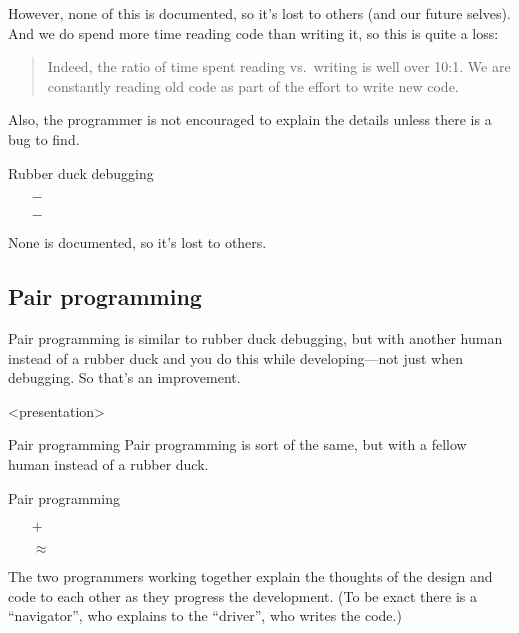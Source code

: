 However, none of this is documented, so it's lost to others (and our future 
selves).
And we do spend more time reading code than writing it, so this is quite a 
loss: \blockcquote[p.~14]{CleanCode}{%
  Indeed, the ratio of time spent reading vs.~writing is well over 10:1.
  We are constantly reading old code as part of the effort to write new code.%
}
Also, the programmer is not encouraged to explain the details unless there is a 
bug to find.

\begin{frame}
\begin{block}{Rubber duck debugging}
  \begin{itemize}
    \item[\(-\)] {\color{red}\LPexplain}
    \item[\(-\)] {\color{red}\LPorder}
  \end{itemize}
\end{block}
\begin{remark}
  None is documented, so it's lost to others.
\end{remark}
\end{frame}

\subsection{Pair programming}

Pair programming is similar to rubber duck debugging, but with another human 
instead of a rubber duck and you do this while developing---not just when 
debugging.
So that's an improvement.

\begin{frame}<presentation>
\begin{block}{Pair programming}
  Pair programming is sort of the same, but with a fellow human instead of a 
  rubber duck.
\end{block}

\begin{block}{Pair programming}
  \begin{itemize}
    \item[\(+\)] {\color{green!75!black}\LPexplain}
    \item[\(\approx\)] {\color{orange}\LPorder}
  \end{itemize}
\end{block}
\end{frame}

The two programmers working together explain the thoughts of the design and 
code to each other as they progress the development.
(To be exact there is a \enquote{navigator}, who explains to the 
\enquote{driver}, who writes the code.)

